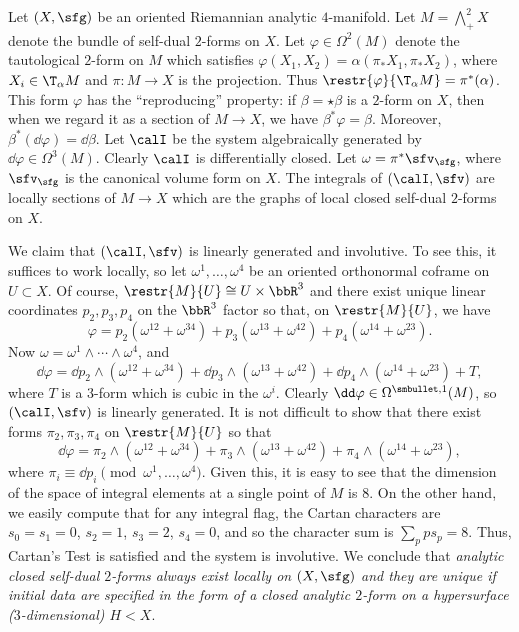 \begin{example}
    Let $(X,\sfg)$ be an oriented Riemannian analytic $4$-manifold. Let $M=\bigwedge^2_+ X$ denote the bundle of self-dual $2$-forms on $X$. Let $\varphi\in\Omega^2(M)$ denote the tautological $2$-form on $M$ which satisfies $\varphi(X_1,X_2)=\alpha(\pi_\ast X_1,\pi_\ast X_2)$, where $X_i\in \T_\alpha M$ and $\pi:M\to X$ is the projection. Thus $\restr{\varphi}{\T_\alpha M}=\pi^\ast(\alpha)$. This form $\varphi$ has the ``reproducing'' property: if $\beta=\star\beta$ is a $2$-form on $X$, then when we regard it as a section of $M\to X$, we have $\beta^\ast\varphi=\beta$. Moreover, $\beta^\ast(\dd\varphi)=\dd\beta$. Let $\calI$ be the system algebraically generated by $\dd\varphi\in\Omega^3(M)$. Clearly $\calI$ is differentially closed. Let $\omega=\pi^\ast\sfv_\sfg$, where $\sfv_\sfg$ is the canonical volume form on $X$. The integrals of $(\calI,\sfv)$ are locally sections of $M\to X$ which are the graphs of local closed self-dual $2$-forms on $X$. 
    
    We claim that $(\calI,\sfv)$ is linearly generated and involutive. To see this, it suffices to work locally, so let $\omega^1,\ldots,\omega^4$ be an oriented orthonormal coframe on $U\subset X$. Of course, $\restr{M}{U}\cong U\times\bbR^3$ and there exist unique linear coordinates $p_2,p_3,p_4$ on the $\bbR^3$ factor so that, on $\restr{M}{U}$, we have 
    \[\varphi=p_2(\omega^{12}+\omega^{34})+p_3(\omega^{13}+\omega^{42})+p_4(\omega^{14}+\omega^{23}).\]
    Now $\omega=\omega^1\wedge\cdots\wedge\omega^4$, and 
    \[\dd\varphi=\dd p_2\wedge(\omega^{12}+\omega^{34})+\dd p_3\wedge(\omega^{13}+\omega^{42})+\dd p_4\wedge(\omega^{14}+\omega^{23})+T,\]
    where $T$ is a $3$-form which is cubic in the $\omega^i$. Clearly $\dd\varphi\in\Omega^{\smbullet,1}(M)$, so $(\calI,\sfv)$ is linearly generated. It is not difficult to show that there exist forms $\pi_2,\pi_3,\pi_4$ on $\restr{M}{U}$ so that 
    \[\dd\varphi=\pi_2\wedge(\omega^{12}+\omega^{34})+\pi_3\wedge(\omega^{13}+\omega^{42})+\pi_4\wedge(\omega^{14}+\omega^{23}),\]
    where $\pi_i\equiv \dd p_i\pmod{\omega^1,\ldots,\omega^4}$. Given this, it is easy to see that the dimension of the space of integral elements at a single point of $M$ is $8$. On the other hand, we easily compute that for any integral flag, the Cartan characters are $s_0=s_1=0$, $s_2=1$, $s_3=2$, $s_4=0$, and so the character sum is $\sum_p ps_p=8$. Thus, Cartan's Test is satisfied and the system is involutive. We conclude that \emph{analytic closed self-dual $2$-forms always exist locally on $(X,\sfg)$ and they are unique if initial data are specified in the form of a closed analytic $2$-form on a hypersurface ($3$-dimensional) $H<X$}.
\end{example}



